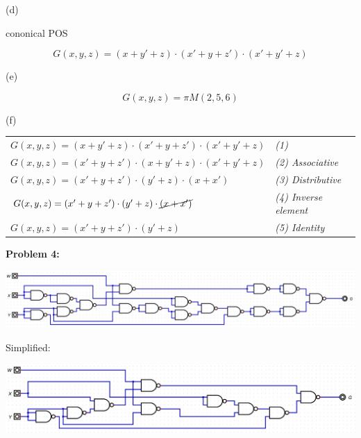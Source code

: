 \documentclass{article}
\begin{document}
    \quad (d)

    \quad\quad cononical POS

    \begin{equation*}
        G(x,y,z) = (x+y'+z) \cdot (x' + y + z') \cdot (x' + y' + z)
    \end{equation*}

    \quad (e)

    \begin{equation*}
        G(x,y,z) = \pi M(2,5,6)
    \end{equation*}

    \quad (f)

    \begin{center}
        \begin{tabularx} {1.2\textwidth} {
            >{\raggedright\arraybackslash}X
            >{\raggedright\arraybackslash}X }
    
            $G(x,y,z) = (x+y'+z) \cdot (x' + y + z') \cdot (x' + y' + z)$ & \emph{(1)} \\
            $G(x,y,z) = (x' + y + z') \cdot (x+y'+z) \cdot (x' + y' + z)$ & \emph{(2) Associative} \\
            $G(x,y,z) = (x' + y + z') \cdot (y'+z)\cdot (x+x')$ & \emph{(3) Distributive} \\
            $G(x,y,z) = (x' + y + z') \cdot (y'+z)\cdot \cancel{(x+x')}$ & \emph{(4) Inverse element} \\
            $G(x,y,z) = (x' + y + z') \cdot (y'+z)$ & \emph{(5) Identity} \\

    
        \end{tabularx}
    \end{center}


    \textbf{Problem 4:}

    \begin{center}
        \includegraphics[width=\linewidth]{q4.jpg}
    \end{center}

    \quad\quad Simplified:

    \begin{center}
        \includegraphics[width=\linewidth]{q4-2.jpg}
    \end{center}
\end{document}
